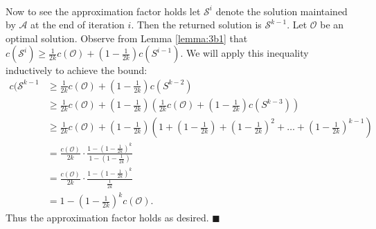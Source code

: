 \documentclass[letterpaper,12pt,oneside,onecolumn]{article}
\newcommand{\cA}{\mathcal{A}} \newcommand{\cB}{\mathcal{B}}
\newcommand{\cO}{\mathcal{O}} \newcommand{\cP}{\mathcal{P}}
\newcommand{\cS}{\mathcal{S}} \newcommand{\cT}{\mathcal{T}}
\begin{document}
\paragraph{} 
Now to see the approximation factor holds let $\cS^i$ denote the solution maintained by $\cA$ at the end of iteration $i$. Then the returned solution is $\cS^{k-1}$. Let $\cO$ be an optimal solution. Observe from Lemma \ref{lemma:3b1} that $c(\cS^{i}) \geq \frac{1}{2k} c(\cO) + (1- \frac{1}{2k})c(S^{i-1})$. We will apply this inequality inductively to achieve the bound:
\begin{align*}
c(\cS^{k-1} &\geq \frac{1}{2k} c(\cO) + (1- \frac{1}{2k})c(S^{k-2}) \\
		&\geq \frac{1}{2k} c(\cO) + (1- \frac{1}{2k})(\frac{1}{2k} c(\cO) + (1- \frac{1}{2k})c(S^{k-3})) \\
		&\geq \frac{1}{2k} c(\cO) + (1- \frac{1}{2k})(1 + (1-\frac{1}{2k}) + (1-\frac{1}{2k})^2 + \dots + (1-\frac{1}{2k})^{k-1}) \\
		&= \frac{c(\cO)}{2k} \cdot \frac{1-(1-\frac{1}{2k})^k}{1-(1-\frac{1}{2k})} \\
		&=\frac{c(\cO)}{2k} \cdot \frac{1-(1-\frac{1}{2k})^k}{\frac{1}{2k}}\\
		&= 1-(1-\frac{1}{2k})^kc(\cO).
\end{align*}
Thus the approximation factor holds as desired. $\blacksquare$
\end{document}

